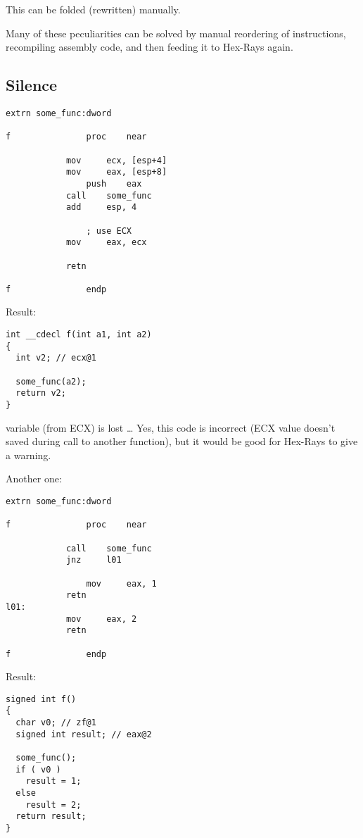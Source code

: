 This can be folded (rewritten) manually.

Many of these peculiarities can be solved by manual reordering of instructions, recompiling assembly code,
and then feeding it to Hex-Rays again.

\subsection{Silence}

\begin{lstlisting}
extrn some_func:dword

f               proc    near

        	mov     ecx, [esp+4]
	        mov     eax, [esp+8]
                push    eax
        	call    some_func
	        add     esp, 4

                ; use ECX
        	mov     eax, ecx

	        retn

f               endp
\end{lstlisting}

Result:

\begin{lstlisting}
int __cdecl f(int a1, int a2)
{
  int v2; // ecx@1

  some_func(a2);
  return v2;
}
\end{lstlisting}

 variable (from ECX) is lost \dots
Yes, this code is incorrect (ECX value doesn't saved during call to another function),
but it would be good for Hex-Rays to give a warning.

Another one:

\begin{lstlisting}
extrn some_func:dword

f               proc    near

	        call    some_func
        	jnz     l01

                mov     eax, 1
	        retn
l01:
	        mov     eax, 2
        	retn

f               endp
\end{lstlisting}

Result:

\begin{lstlisting}
signed int f()
{
  char v0; // zf@1
  signed int result; // eax@2

  some_func();
  if ( v0 )
    result = 1;
  else
    result = 2;
  return result;
}
\end{lstlisting}

